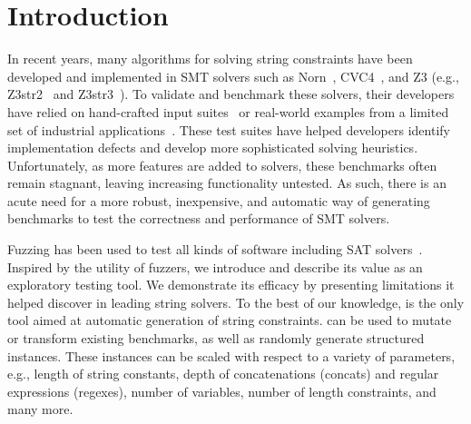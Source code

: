 \section{Introduction}

In recent years, many algorithms for solving string constraints have
been developed and implemented in SMT solvers such as
Norn~\cite{norn}, CVC4~\cite{cvc4}, and Z3 (e.g., Z3str2~\cite{z3str2}
and Z3str3~\cite{z3str3}).  To validate and benchmark these solvers,
their developers have relied on hand-crafted input
suites~\cite{cvc4-tests,z3str3-tests,z3str2-tests} or real-world
examples from a limited set of industrial
applications~\cite{kaluza,kausler}. These test suites have helped
developers identify implementation defects and develop more
sophisticated solving heuristics. Unfortunately, as more features are
added to solvers, these benchmarks often remain stagnant, leaving
increasing functionality untested.  As such, there is an acute need
for a more robust, inexpensive, and automatic way of generating
benchmarks to test the correctness and performance of SMT solvers.

Fuzzing has been used to test all kinds of software including SAT
solvers~\cite{fuzzsat}. Inspired by the utility of fuzzers, we
introduce \fuzzer{} and describe its value as an exploratory testing
tool. We demonstrate its efficacy by presenting limitations it helped
discover in leading string solvers. To the best of our knowledge,
\fuzzer{} is the only tool aimed at automatic generation of string
constraints. \fuzzer{} can be used to mutate or transform existing
benchmarks, as well as randomly generate structured instances. These
instances can be scaled with respect to a variety of parameters, e.g.,
length of string constants, depth of concatenations (concats) and
regular expressions (regexes), number of variables, number of length
constraints, and many more.

